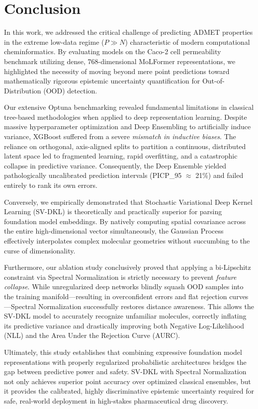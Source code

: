 \section{Conclusion}

In this work, we addressed the critical challenge of predicting ADMET properties in the extreme low-data regime ($P \gg N$) characteristic of modern computational cheminformatics. By evaluating models on the Caco-2 cell permeability benchmark utilizing dense, 768-dimensional MoLFormer representations, we highlighted the necessity of moving beyond mere point predictions toward mathematically rigorous epistemic uncertainty quantification for Out-of-Distribution (OOD) detection.

Our extensive Optuna benchmarking revealed fundamental limitations in classical tree-based methodologies when applied to deep representation learning. Despite massive hyperparameter optimization and Deep Ensembling to artificially induce variance, XGBoost suffered from a severe \textit{mismatch in inductive biases}. The reliance on orthogonal, axis-aligned splits to partition a continuous, distributed latent space led to fragmented learning, rapid overfitting, and a catastrophic collapse in predictive variance. Consequently, the Deep Ensemble yielded pathologically uncalibrated prediction intervals (PICP\_95 $\approx$ 21\%) and failed entirely to rank its own errors.

Conversely, we empirically demonstrated that Stochastic Variational Deep Kernel Learning (SV-DKL) is theoretically and practically superior for parsing foundation model embeddings. By natively computing spatial covariance across the entire high-dimensional vector simultaneously, the Gaussian Process effectively interpolates complex molecular geometries without succumbing to the curse of dimensionality. 

Furthermore, our ablation study conclusively proved that applying a bi-Lipschitz constraint via Spectral Normalization is strictly necessary to prevent \textit{feature collapse}. While unregularized deep networks blindly squash OOD samples into the training manifold—resulting in overconfident errors and flat rejection curves—Spectral Normalization successfully restores distance awareness. This allows the SV-DKL model to accurately recognize unfamiliar molecules, correctly inflating its predictive variance and drastically improving both Negative Log-Likelihood (NLL) and the Area Under the Rejection Curve (AURC).

Ultimately, this study establishes that combining expressive foundation model representations with properly regularized probabilistic architectures bridges the gap between predictive power and safety. SV-DKL with Spectral Normalization not only achieves superior point accuracy over optimized classical ensembles, but it provides the calibrated, highly discriminative epistemic uncertainty required for safe, real-world deployment in high-stakes pharmaceutical drug discovery.
